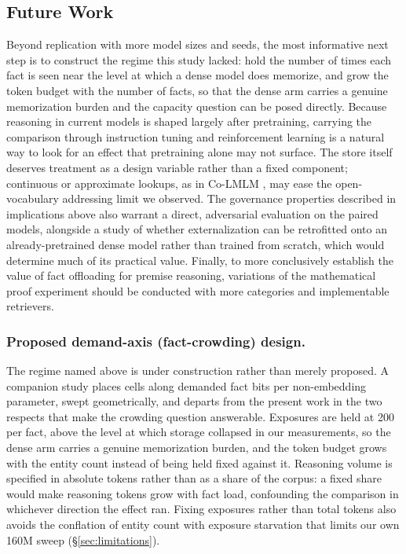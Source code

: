 \documentclass{article}
\begin{document}
\subsection{Future Work}
Beyond replication with more model sizes and seeds, the most informative next step is to construct the regime this study lacked: hold the number of times each fact is seen near the level at which a dense model does memorize, and grow the token budget with the number of facts, so that the dense arm carries a genuine memorization burden and the capacity question can be posed directly. Because reasoning in current models is shaped largely after pretraining, carrying the comparison through instruction tuning and reinforcement learning is a natural way to look for an effect that pretraining alone may not surface. The store itself deserves treatment as a design variable rather than a fixed component; continuous or approximate lookups, as in Co-LMLM \citep{feldman2026colmlm}, may ease the open-vocabulary addressing limit we observed. The governance properties described in implications above also warrant a direct, adversarial evaluation on the paired models, alongside a study of whether externalization can be retrofitted onto an already-pretrained dense model rather than trained from scratch, which would determine much of its practical value. Finally, to more conclusively establish the value of fact offloading for premise reasoning, variations of the mathematical proof experiment should be conducted with more categories and implementable retrievers.

\subsubsection{Proposed demand-axis (fact-crowding) design.}
The regime named above is under construction rather than merely proposed. A companion study places cells
along demanded fact bits per non-embedding parameter, swept geometrically, and departs from the present
work in the two respects that make the crowding question answerable. Exposures are held at 200 per fact,
above the level at which storage collapsed in our measurements, so the dense arm carries a genuine
memorization burden, and the token budget grows with the entity count instead of being held fixed against
it. Reasoning volume is specified in absolute tokens rather than as a share of the corpus: a fixed share
would make reasoning tokens grow with fact load, confounding the comparison in whichever direction the
effect ran. Fixing exposures rather than total tokens also avoids the conflation of entity count with
exposure starvation that limits our own 160M sweep (\S\ref{sec:limitations}).
\end{document}

